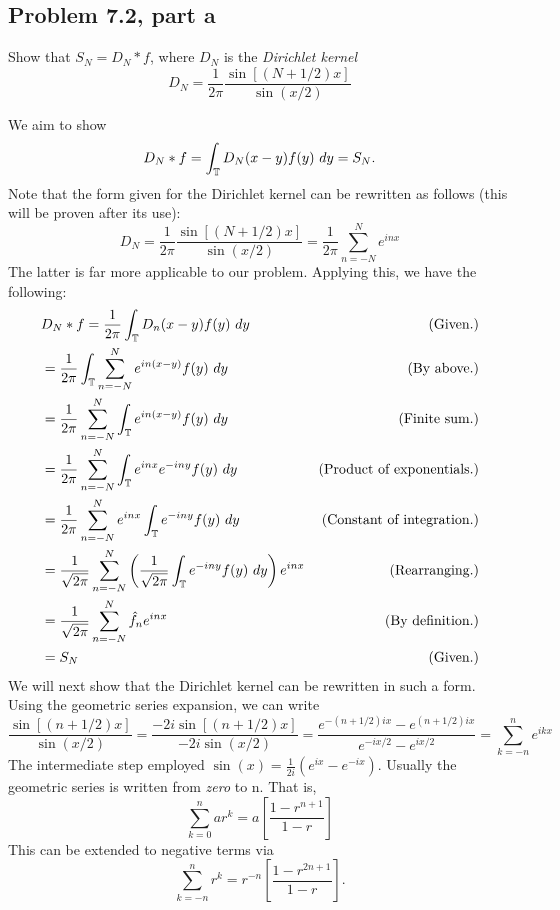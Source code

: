 \subsection{Problem 7.2, part a}
Show that $S_N = D_N \ast f$, where $D_N$ is the \textit{Dirichlet kernel}
\[D_N = \frac{1}{2\pi}\frac{\sin [(N + 1/2)x]}{\sin(x/2)}\]
\partbreak
\begin{solution}

    We aim to show
    \[D_N \ast f = \int_{\mathbb{T}} D_N(x - y)f(y) \ dy = S_N.\]
    Note that the form given for the Dirichlet kernel can be rewritten as follows (this will be proven after its use):
    \[D_N = \frac{1}{2\pi}\frac{\sin [(N + 1/2)x]}{\sin(x/2)} = \frac{1}{2\pi}\sum_{n = -N}^{N} e^{inx}\]
    The latter is far more applicable to our problem. Applying this, we have the following:
    \tightalignbreak
    \begin{align*}
        &D_N\ast f = \frac{1}{2\pi}\int_{\scT} D_n(x - y) f(y) \ dy &\text{(Given.)}\\
        &= \frac{1}{2\pi}\int_{\scT} \sum_{n =-N}^N e^{in(x-y)} f(y) \ dy &\text{(By above.)}\\
        &= \frac{1}{2\pi} \sum_{n =-N}^N \int_{\scT}e^{in(x-y)} f(y) \ dy &\text{(Finite sum.)}\\
        &= \frac{1}{2\pi} \sum_{n =-N}^N \int_{\scT}e^{inx}e^{-iny} f(y) \ dy &\text{(Product of exponentials.)}\\
        &= \frac{1}{2\pi} \sum_{n =-N}^N e^{inx}\int_{\scT}e^{-iny} f(y) \ dy &\text{(Constant of integration.)}\\
        &=\frac{1}{\sqrt{2\pi}}\sum_{n =-N}^N \left( \frac{1}{\sqrt{2\pi}}\int_{\scT}e^{-iny} f(y) \ dy\right)e^{inx}  &\text{(Rearranging.)}\\
        &=\frac{1}{\sqrt{2\pi}}\sum_{n =-N}^N \hat{f}_ne^{inx}  &\text{(By definition.)}\\
        &= S_N &\text{(Given.)}
    \end{align*}    
    \vspace{-12mm}\alignbreak
    We will next show that the Dirichlet kernel can be rewritten in such a form. Using the geometric series expansion, we can write
    \[\frac{\sin [(n + 1/2)x]}{\sin(x/2)} = \frac{-2i\sin [(n + 1/2)x]}{-2i\sin(x/2)} = \frac{e^{-(n+1/2)ix} - e^{(n+1/2)ix}}{e^{-ix/2} - e^{ix/2}} = \sum_{k = -n}^n e^{ikx}\]
    The intermediate step employed $\sin(x) = \frac{1}{2i}(e^{ix} - e^{-ix})$. Usually the geometric series is written from \textit{zero} to n. That is, 
    \[\sum_{k = 0}^n ar^k = a\left[ \frac{1 - r^{n+1}}{1 - r}\right]\]
    This can be extended to negative terms via
    \[\sum_{k = -n}^n r^k = r^{-n}\left[ \frac{1 - r^{2n+1}}{1-r}\right].\]
    
\end{solution}


